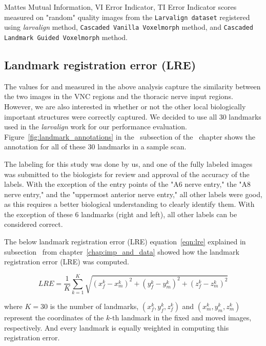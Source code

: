 \documentclass{book}
\begin{document}
	\begin{table}[h!]
		\centering
		
		\caption{Mattes Mutual Information, VI Error Indicator, TI Error Indicator scores measured on "random" quality images from the \texttt{Larvalign dataset} registered using \emph{larvalign} method, \texttt{Cascaded Vanilla Voxelmorph} method, and \texttt{Cascaded Landmark Guided Voxelmorph} method.}
		\label{table:Quality_Random_Fresh}
	\end{table}

	\subsection{Landmark registration error (LRE)} \label{subsec:landmark_distance}
	The values for  and  measured in the above analysis capture the similarity between the two images in the VNC regions and the thoracic nerve input regions. However, we are also interested in whether or not the other local biologically important structures were correctly captured. We decided to use all 30 landmarks used in the \emph{larvalign} work for our performance evaluation. Figure~\ref{fig:landmark_annotations} in the~ subsection of the~ chapter shows the annotation for all of these 30 landmarks in a sample scan. 
	
	The labeling for this study was done by us, and one of the fully labeled images was submitted to the biologists for review and approval of the accuracy of the labels. With the exception of the entry points of the "A6 nerve entry," the "A8 nerve entry," and the "uppermost anterior nerve entry," all other labels were good, as this requires a better biological understanding to clearly identify them. With the exception of these 6 landmarks (right and left), all other labels can be considered correct.
	
	The below landmark registration error (LRE) equation~\eqref{eqn:lre} explained in subsection~ from chapter~\ref{chap:imp_and_data} showed how the landmark registration error (LRE) was computed.
	
	$$ LRE = \frac{1}{K} \sum_{k=1}^K \sqrt{(x_f^k - x_m^k)^2 + (y_f^k - y_m^k)^2 + (z_f^k - z_m^k)^2} $$
	
	where $K=30$ is the number of landmarks, $(x_f^k, y_f^k, z_f^k)$ and $(x_m^k, y_m^k, z_m^k)$ represent the coordinates of the $k$-th landmark in the fixed and moved images, respectively. And every landmark is equally weighted in computing this registration error.
	
\end{document}
